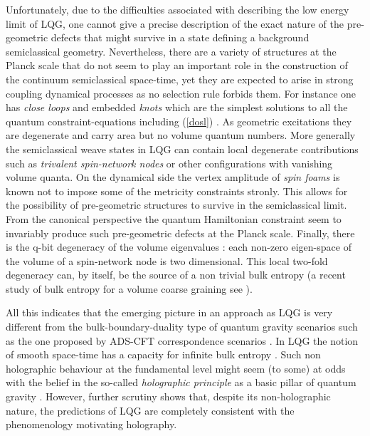 \documentclass[aps, nofootinbib,superscriptaddress,12pt]{revtex4-2}
\begin{document}
Unfortunately, due to the difficulties associated with describing the low energy limit of LQG, one cannot give a precise description of the exact nature of the pre-geometric defects that might survive in a state defining a background semiclassical geometry.  Nevertheless, there are a variety of structures at the Planck scale that do not seem to play an important role in the construction of the continuum semiclassical space-time, yet they are expected to arise in strong coupling dynamical processes as no selection rule forbids them.  For instance one has {\em close loops} and embedded {\em knots} which are the simplest solutions  to all the quantum constraint-equations including (\ref{dosl}) \cite{PhysRevLett.61.1155}. As geometric excitations they are degenerate  and carry area  but no volume quantum numbers.  More generally the semiclassical weave states in LQG can contain local degenerate contributions such as  {\em trivalent spin-network nodes} or other configurations  with vanishing volume quanta.  On the dynamical side the vertex amplitude of {\em spin foams} \cite{Engle:2007wy} is known not to impose some of the metricity constraints stronly. This allows for the possibility of pre-geometric structures to survive \cite{Speziale:2010cf} in the semiclassical limit. From the canonical  perspective the quantum Hamiltonian constraint seem to invariably produce such pre-geometric defects at the Planck scale. Finally, there is the q-bit degeneracy of the volume eigenvalues \cite{Thiemann:1996au, Ashtekar:1997fb, Bianchi:2010gc}: each non-zero eigen-space of the volume of a spin-network node is two dimensional. This local two-fold degeneracy can, by itself, be the source of a non trivial bulk entropy (a recent study of bulk entropy for a volume coarse graining see \cite{Astuti:2016dmk}). 


All this indicates that the emerging picture in an approach as LQG is very different from the bulk-boundary-duality type of quantum gravity scenarios such as the one proposed by  ADS-CFT correspondence scenarios \cite{Maldacena:1997re}. In LQG the notion of smooth space-time has a capacity for infinite bulk entropy . Such non holographic behaviour at the fundamental level might seem (to some) at odds with the belief in the so-called {\em holographic principle} as a basic pillar of quantum gravity  \cite{Bousso:2002ju}.  However, further scrutiny shows that, despite its non-holographic nature, the predictions of  LQG are completely consistent with the phenomenology motivating holography. 
\end{document}
